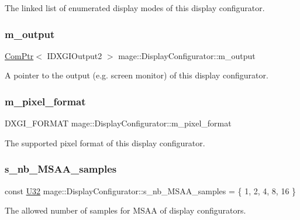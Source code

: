 The linked list of enumerated display modes of this display configurator. \hypertarget{classmage_1_1_display_configurator_a181e657b9ce888d3580c9fdbb50898e2}{}\label{classmage_1_1_display_configurator_a181e657b9ce888d3580c9fdbb50898e2} 
\subsubsection{\texorpdfstring{m\+\_\+output}{m\_output}}
{\footnotesize\ttfamily \hyperlink{namespacemage_ae74f374780900893caa5555d1031fd79}{Com\+Ptr}$<$ I\+D\+X\+G\+I\+Output2 $>$ mage\+::\+Display\+Configurator\+::m\+\_\+output\hspace{0.3cm}{\ttfamily [private]}}

A pointer to the output (e.\+g. screen monitor) of this display configurator. \hypertarget{classmage_1_1_display_configurator_a22998ef4e54c3da0118a734164792b8f}{}\label{classmage_1_1_display_configurator_a22998ef4e54c3da0118a734164792b8f} 
\subsubsection{\texorpdfstring{m\+\_\+pixel\+\_\+format}{m\_pixel\_format}}
{\footnotesize\ttfamily D\+X\+G\+I\+\_\+\+F\+O\+R\+M\+AT mage\+::\+Display\+Configurator\+::m\+\_\+pixel\+\_\+format\hspace{0.3cm}{\ttfamily [private]}}

The supported pixel format of this display configurator. \hypertarget{classmage_1_1_display_configurator_ae4030ce3b63836e4e5c374285cf1f3bc}{}\label{classmage_1_1_display_configurator_ae4030ce3b63836e4e5c374285cf1f3bc} 
\subsubsection{\texorpdfstring{s\+\_\+nb\+\_\+\+M\+S\+A\+A\+\_\+samples}{s\_nb\_MSAA\_samples}}
{\footnotesize\ttfamily const \hyperlink{namespacemage_a41c104c036fba3756a74e19f793eeaa1}{U32} mage\+::\+Display\+Configurator\+::s\+\_\+nb\+\_\+\+M\+S\+A\+A\+\_\+samples = \{ 1, 2, 4, 8, 16 \}\hspace{0.3cm}{\ttfamily [static]}}

The allowed number of samples for M\+S\+AA of display configurators. 